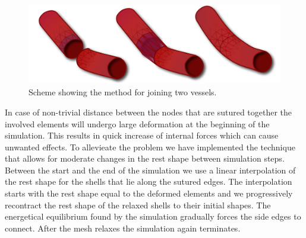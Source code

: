 \begin{figure}[tbh]
\begin{center}
\includegraphics[width=\columnwidth]{img/rest_shape_scheme.png}
\end{center}

\caption{Scheme showing the method for joining two vessels. 
   }
\label{fig-JoiningVessels}
\end{figure}

In case of non-trivial distance between the nodes that are sutured together the involved elements will undergo large deformation at the beginning of the simulation.
This results in quick increase of internal forces which can cause unwanted effects.
To allevieate the problem we have implemented the technique that allows for moderate changes in the rest shape between simulation steps.
Between the start and the end of the simulation we use a linear interpolation of the rest shape for the shells that lie along the sutured edges. 
The interpolation starts with the rest shape equal to the deformed elements and we progressively recontract the rest shape of the relaxed shells to their initial shapes. 
The energetical equilibrium found by the simulation gradually forces the side edges to connect.
After the mesh relaxes the simulation again terminates.

